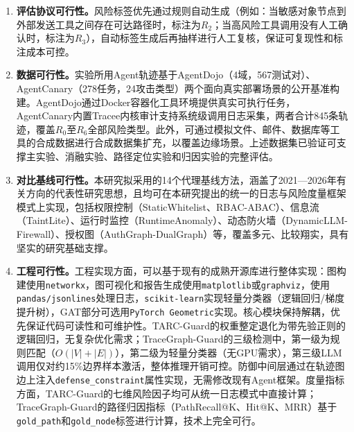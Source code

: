 \begin{enumerate}
  \item \textbf{评估协议可行性。}风险标签优先通过规则自动生成（例如：当敏感对象节点到外部发送工具之间存在可达路径时，标注为$R_2$；当高风险工具调用没有人工确认时，标注为$R_3$），自动标签生成后再抽样进行人工复核，保证可复现性和标注成本可控。
  
  \item \textbf{数据可行性。}实验所用Agent轨迹基于AgentDojo\cite{balunovic2024agentdojo}（4域，567测试对）、AgentCanary\cite{li2026agentcanary}（278任务，24攻击类型）两个面向真实部署场景的公开基准构建。AgentDojo通过Docker容器化工具环境提供真实可执行任务，AgentCanary内置Tracee内核审计支持系统级调用日志采集，两者合计845条轨迹，覆盖$R_0$至$R_6$全部风险类型。此外，可通过模拟文件、邮件、数据库等工具的合成数据进行合成数据集扩充，以覆盖边缘场景。上述数据集已验证可支撑主实验、消融实验、路径定位实验和归因实验的完整评估。

  \item \textbf{对比基线可行性。}本研究拟采用的14个代理基线方法\cite{yao2023react,schick2023toolformer,patil2024gorilla,qin2024toolllm,balunovic2024agentdojo,xie2024osworld,bonatti2025windows,krawiecka2025extending,debenedetti2025camel,costa2025fides,abdelnabi2025firewalls,dong2026pear,wang2026aligning,he2025sentinelagent}，涵盖了2021—2026年有关方向的代表性研究思想，且均可在本研究提出的统一的日志与风险度量框架模式上实现，包括权限控制（StaticWhitelist\cite{yao2023react,schick2023toolformer}、RBAC-ABAC\cite{shi2025progent}）、信息流（TaintLite\cite{costa2025fides}）、运行时监控（RuntimeAnomaly\cite{he2025sentinelagent}）、动态防火墙（DynamicLLM-Firewall\cite{abdelnabi2025firewalls}）、授权图（AuthGraph-DualGraph\cite{wang2026aligning}）等，覆盖多元、比较翔实，具有坚实的研究基础支撑。
  
  \item \textbf{工程可行性。}工程实现方面，可以基于现有的成熟开源库进行整体实现：图构建使用\texttt{networkx}，图可视化和报告生成使用\texttt{matplotlib}或\texttt{graphviz}，使用\texttt{pandas/jsonlines}处理日志，\texttt{scikit-learn}实现轻量分类器（逻辑回归/梯度提升树），GAT部分可选用\texttt{PyTorch Geometric}实现。核心模块保持解耦，优先保证代码可读性和可维护性。TARC-Guard的权重整定退化为带先验正则的逻辑回归，无复杂优化需求；TraceGraph-Guard的三级检测中，第一级为规则匹配（$O(|V|+|E|)$），第二级为轻量分类器（无GPU需求），第三级LLM调用仅对约15\%边界样本激活，整体推理开销可控。防御中间层通过在轨迹图边上注入\texttt{defense\_constraint}属性实现，无需修改现有Agent框架。度量指标方面，TARC-Guard的七维风险因子均可从统一日志模式中直接计算；TraceGraph-Guard的路径归因指标（PathRecall@K、Hit@K、MRR）基于\texttt{gold\_path}和\texttt{gold\_node}标签进行计算，技术上完全可行。

\end{enumerate}

